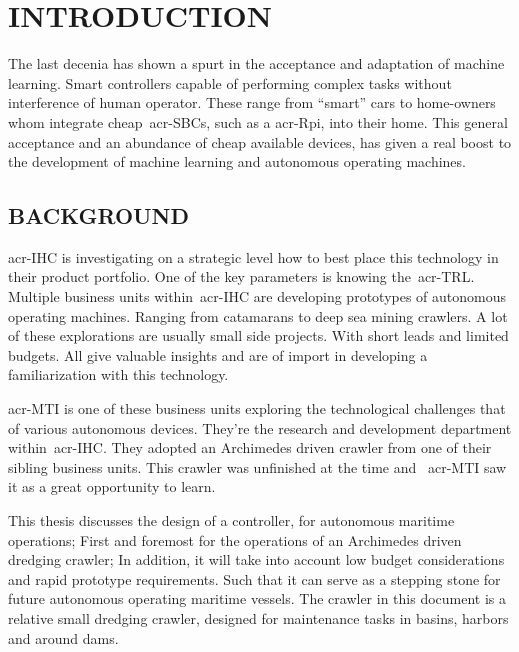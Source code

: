 

\chapter{INTRODUCTION}\label{chap:introduction}

The last decenia has shown a spurt in the acceptance and adaptation of machine learning. Smart controllers capable of
performing complex tasks without interference of human operator. These range from ``smart'' cars to home-owners whom 
integrate cheap~\glspl{acr-SBC}, such as a \gls{acr-Rpi}, into their home. This general acceptance and an abundance 
of cheap available devices, has given a real boost to the development of machine learning and autonomous operating 
machines.


\section{BACKGROUND}\label{sec:background}

\gls{acr-IHC} is investigating on a strategic level how to best place this technology in their product portfolio. One
of the key parameters is knowing the~\gls{acr-TRL}. Multiple business units within~\gls{acr-IHC} are developing 
prototypes of autonomous operating machines. Ranging from catamarans to deep sea mining crawlers. A lot of these 
explorations are usually small side projects. With short leads and limited budgets. All give valuable insights and 
are of import in developing a familiarization with this technology.

\gls{acr-MTI} is one of these business units exploring the technological challenges that of various autonomous devices.
They're the research and development department within~\gls{acr-IHC}. They adopted an Archimedes driven crawler from
one of their sibling business units. This crawler was unfinished at the time and ~\gls{acr-MTI} saw it as a great
opportunity to learn.

This thesis discusses the design of a controller, for autonomous maritime operations; First and foremost for the
operations of an Archimedes driven dredging crawler; In addition, it will take into account low budget considerations
and rapid prototype requirements. Such that it can serve as a stepping stone for future autonomous operating maritime
vessels. The crawler in this document is a relative small dredging crawler, designed for maintenance tasks in
basins, harbors and around dams.


